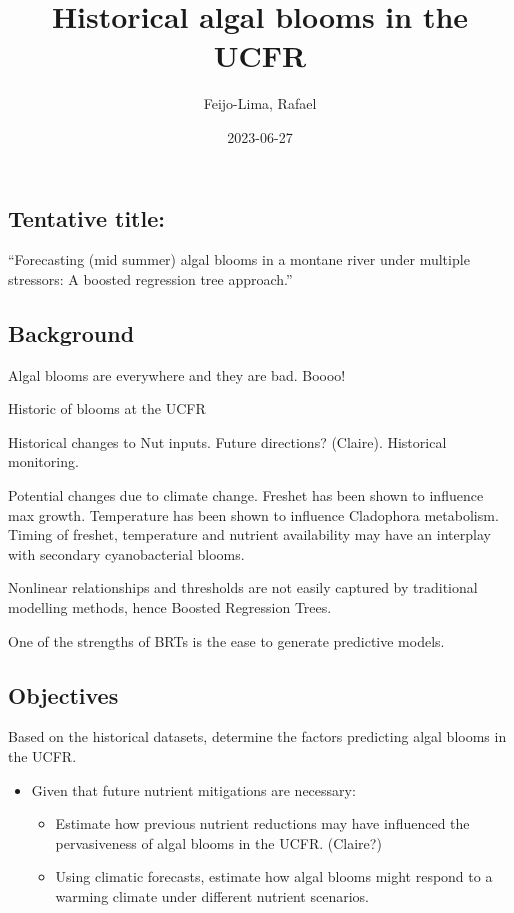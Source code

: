 \documentclass[
]{article}
\title{Historical algal blooms in the UCFR}
\author{Feijo-Lima, Rafael}
\date{2023-06-27}
\providecommand{\tightlist}{%
  \setlength{\itemsep}{0pt}\setlength{\parskip}{0pt}}
\begin{document}
\maketitle

\hypertarget{tentative-title}{%
\subsection{Tentative title:}\label{tentative-title}}

``Forecasting (mid summer) algal blooms in a montane river under
multiple stressors: A boosted regression tree approach.''

\hypertarget{background}{%
\subsection{Background}\label{background}}

Algal blooms are everywhere and they are bad. Boooo!

Historic of blooms at the UCFR

Historical changes to Nut inputs. Future directions? (Claire).
Historical monitoring.

Potential changes due to climate change. Freshet has been shown to
influence max growth. Temperature has been shown to influence Cladophora
metabolism. Timing of freshet, temperature and nutrient availability may
have an interplay with secondary cyanobacterial blooms.

Nonlinear relationships and thresholds are not easily captured by
traditional modelling methods, hence Boosted Regression Trees.

One of the strengths of BRTs is the ease to generate predictive models.

\hypertarget{objectives}{%
\subsection{Objectives}\label{objectives}}

Based on the historical datasets, determine the factors predicting algal
blooms in the UCFR.

\begin{itemize}
\tightlist
\item
  Given that future nutrient mitigations are necessary:

  \begin{itemize}
  \tightlist
  \item
    Estimate how previous nutrient reductions may have influenced the
    pervasiveness of algal blooms in the UCFR. (Claire?)
  \item
    Using climatic forecasts, estimate how algal blooms might respond to
    a warming climate under different nutrient scenarios.
  \end{itemize}
\end{itemize}
\end{document}

